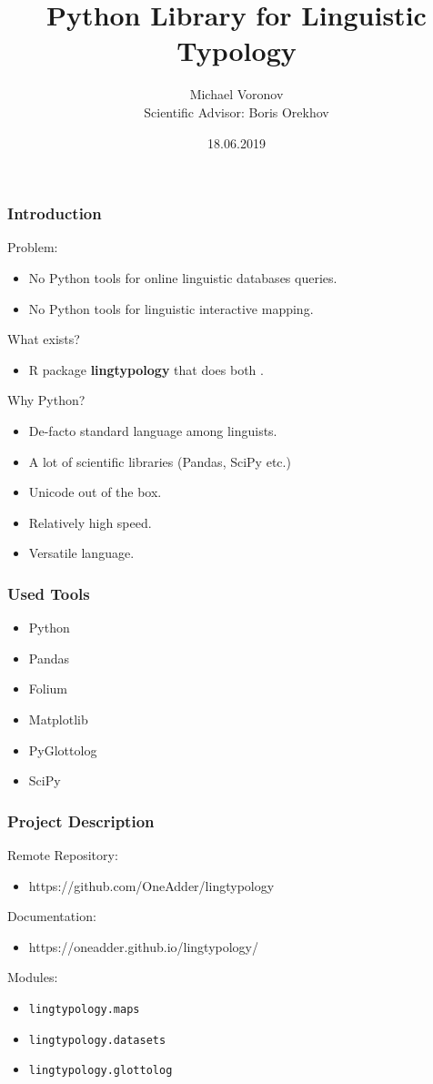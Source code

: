\documentclass{beamer}
\title{Python Library for Linguistic Typology}
\author[Michael Voronov]{Michael Voronov\\{\small Scientific Advisor: Boris Orekhov}}
\institute{Higher School of Economics}
\date{18.06.2019}
\begin{document}
 
\frame{\titlepage}
 
\begin{frame}
\frametitle{Introduction}
Problem:
\begin{itemize}
 \item No Python tools for online linguistic databases queries.
 \item No Python tools for linguistic interactive mapping.
\end{itemize}
What exists?
\begin{itemize}
 \item R package \textbf{lingtypology} that does both \parencite{GeorgeMoroz2018}.
\end{itemize}
Why Python?
\begin{itemize}
 \item De-facto standard language among linguists.
 \item A lot of scientific libraries (Pandas, SciPy etc.)
 \item Unicode out of the box.
 \item Relatively high speed.
 \item Versatile language.
\end{itemize}
\end{frame}
 
\begin{frame}
\frametitle{Used Tools}
\begin{itemize}
 \item Python \parencite{python}
 \item Pandas \parencite{pandas}
 \item Folium \parencite{folium}
 \item Matplotlib \parencite{matplotlib}
 \item PyGlottolog \parencite{Robert2Forkel2019}
 \item SciPy \parencite{scipy}
\end{itemize}
\end{frame}


\begin{frame}
\frametitle{Project Description}
Remote Repository:
\begin{itemize}
 \item https://github.com/OneAdder/lingtypology
\end{itemize}
Documentation:
\begin{itemize}
 \item https://oneadder.github.io/lingtypology/
\end{itemize}
Modules:
\begin{itemize}
 \item \texttt{lingtypology.maps}
 \item \texttt{lingtypology.datasets}
 \item \texttt{lingtypology.glottolog}
\end{itemize}
\end{frame}
\end{document}
